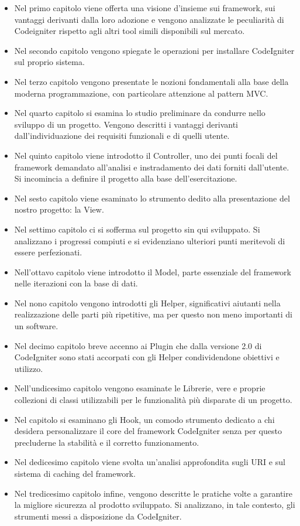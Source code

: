 \begin{itemize}
\item Nel primo capitolo viene offerta una visione d'insieme sui framework, sui vantaggi derivanti dalla loro adozione e vengono analizzate le peculiarità di Codeigniter rispetto agli altri tool simili disponibili sul mercato.
\item Nel secondo capitolo vengono spiegate le operazioni per installare CodeIgniter sul proprio sistema.
\item Nel terzo capitolo vengono presentate le nozioni fondamentali alla base della moderna programmazione, con particolare attenzione al pattern \ac{MVC}.
\item Nel quarto capitolo si esamina lo studio preliminare da condurre nello sviluppo di un progetto. Vengono descritti i vantaggi derivanti dall'individuazione dei requisiti funzionali e di quelli utente.
\item Nel quinto  capitolo viene introdotto il Controller, uno dei punti focali del framework demandato all'analisi e instradamento dei dati forniti dall'utente. Si incomincia a definire il progetto alla base dell'esercitazione.
\item Nel sesto capitolo viene esaminato lo strumento dedito alla presentazione del nostro progetto: la View.
\item Nel settimo capitolo ci si sofferma sul progetto sin qui sviluppato. Si analizzano i progressi compiuti e si evidenziano ulteriori punti meritevoli di essere perfezionati.
\item Nell'ottavo capitolo viene introdotto il Model, parte essenziale del framework nelle iterazioni con la base di dati.
\item Nel nono capitolo vengono introdotti gli Helper, significativi aiutanti nella realizzazione delle parti più ripetitive, ma per questo non meno importanti di un software.
\item Nel decimo capitolo breve accenno ai Plugin che dalla versione 2.0 di CodeIgniter sono stati accorpati con gli Helper condividendone obiettivi e utilizzo.
\item Nell'undicesimo capitolo vengono esaminate le Librerie, vere e proprie collezioni di classi utilizzabili per le funzionalità più disparate di un progetto.
\item Nel  capitolo si esaminano gli Hook, un comodo strumento dedicato a chi desidera personalizzare il core del framework CodeIgniter senza per questo precluderne la stabilità e il corretto funzionamento.
\item Nel dedicesimo capitolo viene svolta un'analisi approfondita sugli URI e sul sistema di caching del framework.
\item Nel tredicesimo capitolo infine, vengono descritte le pratiche volte a garantire la migliore sicurezza al prodotto sviluppato. Si analizzano, in tale contesto, gli strumenti messi a disposizione da CodeIgniter.
\end{itemize}